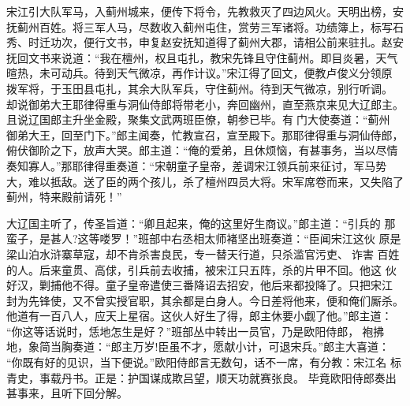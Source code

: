宋江引大队军马，入蓟州城来，便传下将令，先教救灭了四边风火。天明出榜，安
抚蓟州百姓。将三军人马，尽数收入蓟州屯住，赏劳三军诸将。功绩簿上，标写石
秀、时迁功次，便行文书，申复赵安抚知道得了蓟州大郡，请相公前来驻扎。赵安
抚回文书来说道：“我在檀州，权且屯扎，教宋先锋且守住蓟州。即目炎暑，天气
暄热，未可动兵。待到天气微凉，再作计议。”宋江得了回文，便教卢俊义分领原
拨军将，于玉田县屯扎，其余大队军兵，守住蓟州。待到天气微凉，别行听调。
却说御弟大王耶律得重与洞仙侍郎将带老小，奔回幽州，直至燕京来见大辽郎主。
且说辽国郎主升坐金殿，聚集文武两班臣僚，朝参已毕。有门大使奏道：“蓟州
御弟大王，回至门下。”郎主闻奏，忙教宣召，宣至殿下。那耶律得重与洞仙侍郎，
俯伏御阶之下，放声大哭。郎主道：“俺的爱弟，且休烦恼，有甚事务，当以尽情
奏知寡人。”那耶律得重奏道：“宋朝童子皇帝，差调宋江领兵前来征讨，军马势
大，难以抵敌。送了臣的两个孩儿，杀了檀州四员大将。宋军席卷而来，又失陷了
蓟州，特来殿前请死！”

大辽国主听了，传圣旨道：“卿且起来，俺的这里好生商议。”郎主道：“引兵的
那蛮子，是甚人?这等喽罗！”班部中右丞相太师褚坚出班奏道：“臣闻宋江这伙
原是梁山泊水浒寨草寇，却不肯杀害良民，专一替天行道，只杀滥官污吏、诈害
百姓的人。后来童贯、高俅，引兵前去收捕，被宋江只五阵，杀的片甲不回。他这
伙好汉，剿捕他不得。童子皇帝遣使三番降诏去招安，他后来都投降了。只把宋江
封为先锋使，又不曾实授官职，其余都是白身人。今日差将他来，便和俺们厮杀。
他道有一百八人，应天上星宿。这伙人好生了得，郎主休要小觑了他。”郎主道：
“你这等话说时，恁地怎生是好？”班部丛中转出一员官，乃是欧阳侍郎，袍拂
地，象简当胸奏道：“郎主万岁!臣虽不才，愿献小计，可退宋兵。”郎主大喜道：
“你既有好的见识，当下便说。”欧阳侍郎言无数句，话不一席，有分教：宋江名
标青史，事载丹书。正是：护国谋成欺吕望，顺天功就赛张良。
毕竟欧阳侍郎奏出甚事来，且听下回分解。
